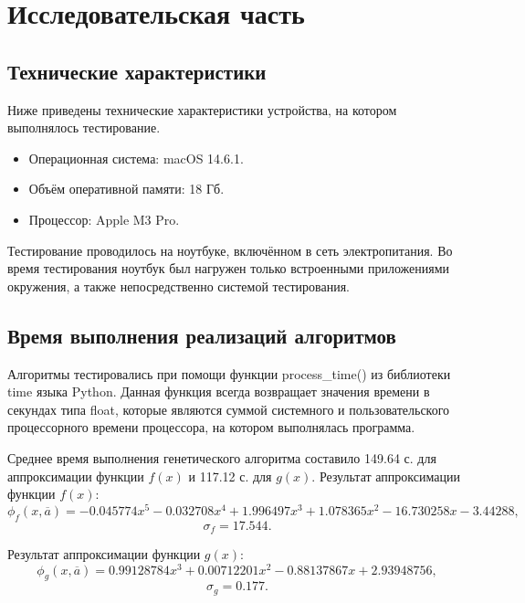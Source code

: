 \chapter{Исследовательская часть}

\section{Технические характеристики}

Ниже приведены технические характеристики устройства, на котором выполнялось тестирование.

\begin{itemize}
	\item Операционная система: macOS 14.6.1.
	\item Объём оперативной памяти: 18 Гб.
	\item Процессор: Apple M3 Pro.
\end{itemize}

Тестирование проводилось на ноутбуке, включённом в сеть электропитания. Во время тестирования ноутбук был нагружен только встроенными приложениями окружения, а также непосредственно системой тестирования.

% 

\section{Время выполнения реализаций алгоритмов}

Алгоритмы тестировались при помощи функции process\_time() из библиотеки time языка Python. Данная функция всегда возвращает значения времени в секундах типа float, которые являются суммой системного и пользовательского процессорного времени процессора, на котором выполнялась программа.~\cite{pythonlangtime}

Среднее время выполнения генетического алгоритма составило 149.64 с. для аппроксимации функции $f(x)$ и 117.12 с. для $g(x)$. Результат аппроксимации функции $f(x)$: 
\begin{equation}
	\phi_f(x, \overline{a}) = -0.045774x^5-0.032708x^4+1.996497x^3+1.078365x^2-16.730258x-3.44288,
\end{equation}
\begin{equation}
	\sigma_f = 17.544.
\end{equation}

Результат аппроксимации функции $g(x)$: 
\begin{equation}
	\phi_g(x, \overline{a}) = 0.99128784x^3 + 0.00712201x^2 -0.88137867x + 2.93948756,
	\end{equation}
	\begin{equation}
	\sigma_g = 0.177.
\end{equation}

